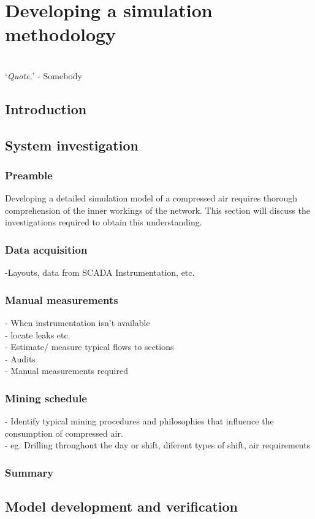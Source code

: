 \chapter{Developing a simulation methodology}
\thispagestyle{empty}
\vspace{38em}
\hrulefill
\\
\enquote*{\textit{Quote.}} - Somebody\\
\newpage
\section{Introduction}
\section{System investigation}
	\subsection{Preamble}
		Developing a detailed simulation model of a compressed air requires thorough comprehension of the inner workings of the network. This section will discuss the investigations required to obtain this understanding.
	\subsection{Data acquisition} %
		-Layouts, data from SCADA Instrumentation, etc.
	\subsection{Manual measurements}
		- When instrumentation isn't available\\
		- locate leaks etc.\\
		- Estimate/ measure typical flows to sections\\
		- Audits\\
		- Manual measurements required
	\subsection{Mining schedule}
		- Identify typical mining procedures and philosophies that influence the consumption of compressed air.\\
		- eg. Drilling throughout the day or shift, diferent types of shift, air requirements
	\subsection{Summary}
\section{Model development and verification}
